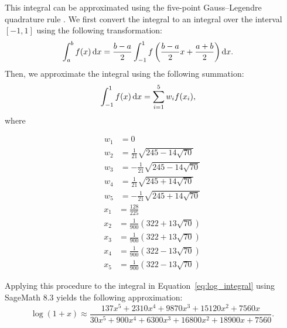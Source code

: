 This integral can be approximated using the five-point Gauss--Legendre quadrature rule \cite{kythe_quadrature_2002}. We first convert the integral to an integral over the interval $[-1,1]$ using the following transformation:
\begin{align*}
	\int_a^b{f(x)\mathop{}\!\mathrm{d} x}
	&= \frac{b-a}{2}\int_{-1}^{1}{f\left(\frac{b-a}{2}x+\frac{a+b}{2}\right)\mathop{}\!\mathrm{d} x}.
\end{align*}
Then, we approximate the integral using the following summation:
\begin{align*}
  \int_{-1}^{1}{f(x)\mathop{}\!\mathrm{d} x} &= \sum_{i=1}^{5}{w_if(x_i)},
\end{align*}
where
\begin{multicols}{2}
	\noindent
	\begin{align*}
		w_1 &= 0\\
		w_2 &= \frac{1}{21}\sqrt{245-14\sqrt{70}}\\
		w_3 &= -\frac{1}{21}\sqrt{245-14\sqrt{70}}\\
		w_4 &= \frac{1}{21}\sqrt{245+14\sqrt{70}}\\
		w_5 &= -\frac{1}{21}\sqrt{245+14\sqrt{70}}
	\end{align*}
	\begin{align*}
		x_1 &= \frac{128}{225}\\
		x_2 &= \frac{1}{900}\left( 322 + 13\sqrt{70}\right)\\
		x_3 &= \frac{1}{900}\left( 322 + 13\sqrt{70}\right)\\
		x_4 &= \frac{1}{900}\left( 322 - 13\sqrt{70}\right)\\
		x_5 &= \frac{1}{900}\left( 322 - 13\sqrt{70}\right)
	\end{align*}
\end{multicols}

Applying this procedure to the integral in Equation~\ref{eq:log_integral} using SageMath 8.3 yields the following approximation:
\begin{equation}\label{eq:standardquadrature}
  \log(1+x) \approx
  \frac{137x^5 + 2310x^4 + 9870x^3 + 15120x^2 + 7560x}
  {30x^5 + 900x^4 + 6300x^3 + 16800x^2 + 18900x + 7560}.
\end{equation}


